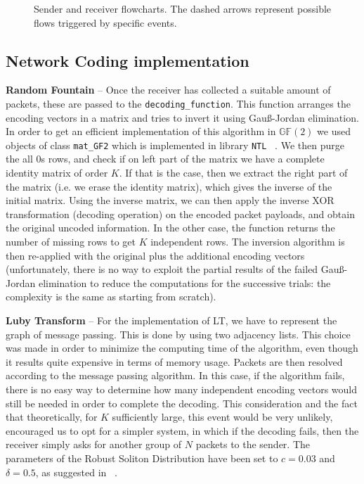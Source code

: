 \begin{sidewaysfigure}
\begin{subfigure}{0.5\hsize}
\end{subfigure}

\caption{Sender and receiver flowcharts. The dashed arrows represent possible flows triggered by specific events.}
\label{fig:flowchart}
\end{sidewaysfigure}

\subsection{Network Coding implementation}
\textbf{Random Fountain} -- Once the receiver has collected a suitable amount of packets, these are passed to the \texttt{decoding\_function}. This function arranges the encoding vectors in a matrix and tries to invert it using Gau{\ss}-Jordan elimination. In order to get an efficient implementation of this algorithm in $\mathds{G}\mathds{F}(2)$ we used objects of class \texttt{mat\_GF2} which is implemented in library \texttt{NTL} ~\cite{NTL}. We then purge the all 0s rows, and check if on left part of the matrix we have a complete identity matrix of order $K$. If that is the case, then we extract the right part of the matrix  (i.e. we erase the identity matrix), which gives the inverse of the initial matrix. Using the inverse matrix, we can then apply the inverse XOR transformation (decoding operation) on the encoded packet payloads, and obtain the original uncoded information. In the other case, the function returns the number of missing rows to get $K$ independent rows. The inversion algorithm is then re-applied with the original plus the additional encoding vectors (unfortunately, there is no way to exploit the partial results of the failed Gau{\ss}-Jordan elimination to reduce the computations for the successive trials: the complexity is the same as starting from scratch).

\textbf{Luby Transform} -- For the implementation of LT, we have to represent the graph of message passing. This is done by using two adjacency lists. This choice was made in order to minimize the computing time of the algorithm, even though it results quite expensive in terms of memory usage. Packets are then resolved according to the message passing algorithm. In this case, if the algorithm fails, there is no easy way to determine how many independent encoding vectors would still be needed in order to complete the decoding. This consideration and the fact that theoretically, for $K$ sufficiently large, this event would be very unlikely, encouraged us to opt for a simpler system, in which if the decoding fails, then the receiver simply asks for another group of $N$ packets to the sender. The parameters of the Robust Soliton Distribution have been set to $c=0.03$ and $\delta=0.5$, as suggested in ~\cite{RSD}.

